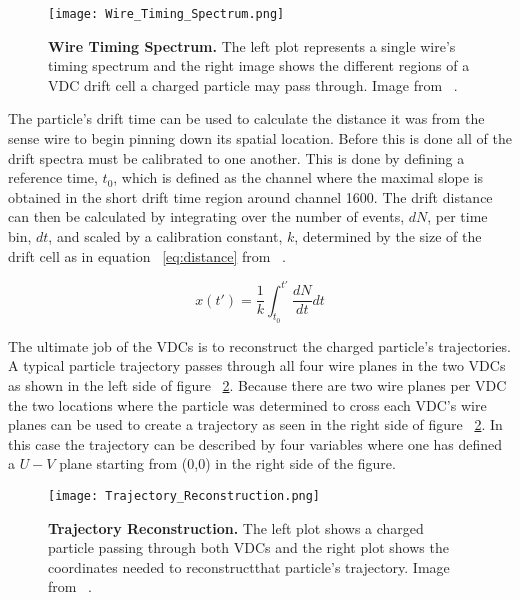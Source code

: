 \begin{figure}[!ht]
\begin{center}
\texttt{[image: Wire\_Timing\_Spectrum.png]}
\end{center}
\caption{
{\bf{Wire Timing Spectrum.}} The left plot represents a single wire's timing spectrum and the right image shows the different regions of a VDC drift cell a charged particle may pass through. Image from ~\cite{Article:VDCs}.}
\label{fig:drift}
\end{figure}

The particle's drift time can be used to calculate the distance it was from the sense wire to begin pinning down its spatial location. Before this is done all of the drift spectra must be calibrated to one another. This is done by defining a reference time, $t_0$, which is defined as the channel where the maximal slope is obtained in the short drift time region around channel 1600. The drift distance can then be calculated by integrating over the number of events, $dN$, per time bin, $dt$, and scaled by a calibration constant, $k$, determined by the size of the drift cell as in equation ~\ref{eq:distance} from ~\cite{Article:VDCs}.

\begin{equation} \label{eq:distance}
	x(t') = \frac{1}{k} \int_{t_0}^{t'} \frac{dN}{dt} dt
\end{equation}

The ultimate job of the VDCs is to reconstruct the charged particle's trajectories. A typical particle trajectory passes through all four wire planes in the two VDCs as shown in the left side of figure ~\ref{fig:trajectory}. Because there are two wire planes per VDC the two locations where the particle was determined to cross each VDC's wire planes can be used to create a trajectory as seen in the right side of figure ~\ref{fig:trajectory}. In this case the trajectory can be described by four variables where one has defined a $U-V$ plane starting from (0,0) in the right side of the figure. 

\begin{figure}[!ht]
\begin{center}
\texttt{[image: Trajectory\_Reconstruction.png]}
\end{center}
\caption{
{\bf{Trajectory Reconstruction.}} The left plot shows a charged particle passing through both VDCs and the right plot shows the coordinates needed to reconstructthat particle's trajectory. Image from ~\cite{Article:VDCs}.}
\label{fig:trajectory}
\end{figure}

